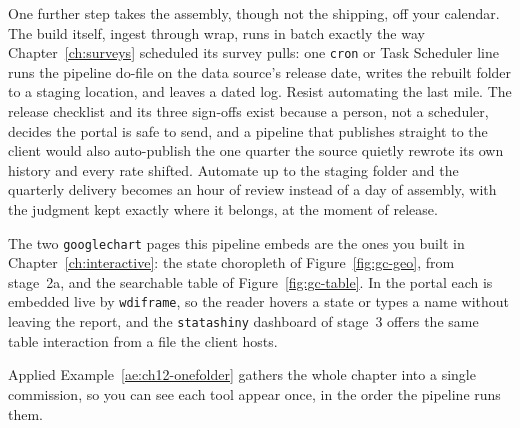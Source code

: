 One further step takes the assembly, though not the shipping, off your calendar. The build itself, ingest through wrap, runs in batch exactly the way Chapter~\ref{ch:surveys} scheduled its survey pulls: one \texttt{cron} or Task Scheduler line runs the pipeline do-file on the data source's release date, writes the rebuilt folder to a staging location, and leaves a dated log. Resist automating the last mile. The release checklist and its three sign-offs exist because a person, not a scheduler, decides the portal is safe to send, and a pipeline that publishes straight to the client would also auto-publish the one quarter the source quietly rewrote its own history and every rate shifted. Automate up to the staging folder and the quarterly delivery becomes an hour of review instead of a day of assembly, with the judgment kept exactly where it belongs, at the moment of release.

The two \texttt{googlechart} pages this pipeline embeds are the ones you built in Chapter~\ref{ch:interactive}: the state choropleth of Figure~\ref{fig:gc-geo}, from stage~2a, and the searchable table of Figure~\ref{fig:gc-table}. In the portal each is embedded live by \texttt{wdiframe}, so the reader hovers a state or types a name without leaving the report, and the \texttt{statashiny} dashboard of stage~3 offers the same table interaction from a file the client hosts.

Applied Example~\ref{ae:ch12-onefolder} gathers the whole chapter into a single commission, so you can see each tool appear once, in the order the pipeline runs them.


